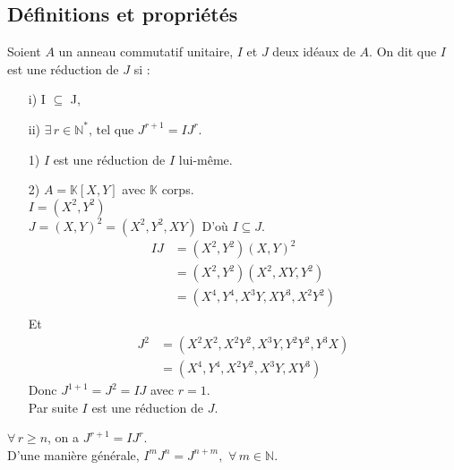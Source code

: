 \subsection{Définitions et propriétés}
\begin{madefinition}
	Soient $A$ un anneau commutatif unitaire, $I$ et $J$ deux id\'eaux de $A$.
	On dit que $I$ est une réduction de $J$ si :\\
	\begin{enumerate}
		\item[i)] I $\subseteq$ J,
		\item[ii)] $\exists \, r\in \mathbb{N}^{*} \text{, tel que } J^{r+1} = IJ^{r}$.
	\end{enumerate}
\end{madefinition}
\begin{monexemple}
	\begin{enumerate}
		\item[1)] $I$ est une réduction de $I$ lui-même.
		\item[2)] $A =\mathbb{K}[X,Y]$ avec $\mathbb{K}$ corps.\\
		$I = (X^2, Y^2)$\\
		$J = (X,Y)^2 = (X^2, Y^2, XY) $ D'où $I \subseteq J$.
		\begin{align*}
			IJ&= (X^{2},Y^{2})(X,Y)^{2}\\
			&= (X^{2},Y^{2})(X^{2},XY,Y^{2})\\
			&= (X^{4},Y^{4},X^{3}Y,XY^{3},X^{2}Y^{2})\\
		\end{align*}
		Et \\ 
		\begin{align*}
			J^2 &= (X^2X^2, X^2Y^2, X^3Y, Y^2Y^2, Y^3X)\\
			&= (X^4, Y^4, X^2Y^2, X^3Y, XY^3)
		\end{align*}
		Donc $J^{1+1} = J^2 = IJ $ avec $r=1$.\\
		Par suite $I$ est une réduction de $J$.
	\end{enumerate}
\end{monexemple}
\begin{maremarque}
	$\forall \, r\geq n$, on a $J^{r+1} = IJ^{r}$.\\
	D'une manière générale, $I^{m}J^{n}=J^{n+m}, \, \, \forall \, m\in \mathbb{N}$.	
\end{maremarque}

